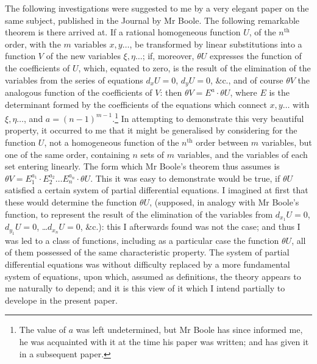 \documentclass[11pt]{article}
\begin{document}
The following investigations were suggested to me by a very elegant paper on
the same subject, published in the Journal by Mr Boole. The following remarkable
theorem is there arrived at. If a rational homogeneous function $U$, of the $n^{\text{th}}$ order,
with the $m$ variables $x, y \ldots$, be transformed by linear substitutions into a function
$V$ of the new variables $\xi, \eta \ldots$; if, moreover, $\theta U$ expresses the function of the
coefficients of $U$, which, equated to zero, is the result of the elimination of the
variables from the series of equations $d_x U=0$, $d_y U=0$, \&c., and of course $\theta V$ the
analogous function of the coefficients of $V$: then $\theta V = E^a \cdot \theta U$, where $E$ is the
determinant formed by the coefficients of the equations which connect $x, y \ldots$ with
$\xi, \eta \ldots$, and $a=(n-1)^{m-1}$.\footnote{The value of $a$ was left undetermined, but Mr Boole has since informed me, he was acquainted with
it at the time his paper was written; and has given it in a subsequent paper.} In attempting to demonstrate this very beautiful property,
it occurred to me that it might be generalised by considering for the function $U$, not
a homogeneous function of the $n^{\text{th}}$ order between $m$ variables, but one of the same
order, containing $n$ sets of $m$ variables, and the variables of each set entering
linearly. The form which Mr Boole's theorem thus assumes is $\theta V = E_1^{a_1} \cdot E_2^{a_2} \ldots E_n^{a_n} \cdot \theta U$.
This it was easy to demonstrate would be true, if $\theta U$ satisfied a certain system of
partial differential equations. I imagined at first that these would determine the function
$\theta U$, (supposed, in analogy with Mr Boole's function, to represent the result of the
elimination of the variables from $d_{x_1} U=0$, $d_{y_1} U=0$, \ldots $d_{x_n} U=0$, \&c.): this I afterwards
found was not the case; and thus I was led to a class of functions, including as
a particular case the function $\theta U$, all of them possessed of the same characteristic
property. The system of partial differential equations was without difficulty replaced
by a more fundamental system of equations, upon which, assumed as definitions, the
theory appears to me naturally to depend; and it is this view of it which I intend
partially to develope in the present paper.

\medskip
\end{document}
